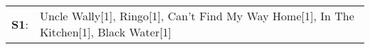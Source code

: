 \begin{supertabular}{p{0.03\textwidth}p{0.92\textwidth}}
 \textbf{S1}:  &  Uncle Wally[1]\textsuperscript{}, \enspace Ringo[1]\textsuperscript{}, \enspace Can't Find My Way Home[1]\textsuperscript{}, \enspace In The Kitchen[1]\textsuperscript{}, \enspace Black Water[1]\textsuperscript{}  \enspace  \\
\end{supertabular}
